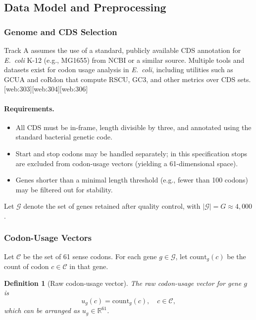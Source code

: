 \documentclass[11pt]{article}
\newtheorem{definition}{Definition}[section]
\newcommand{\R}{\mathbb{R}}
\begin{document}
\subsection{Data Model and Preprocessing}

\subsubsection{Genome and CDS Selection}

Track A assumes the use of a standard, publicly available CDS annotation for \emph{E.~coli} K-12 (e.g., MG1655) from NCBI or a similar source.
Multiple tools and datasets exist for codon usage analysis in \emph{E.~coli}, including utilities such as GCUA and coRdon that compute RSCU, GC3, and other metrics over CDS sets.[web:303][web:304][web:306]

\paragraph{Requirements.}
\begin{itemize}[leftmargin=1.8em]
  \item All CDS must be in-frame, length divisible by three, and annotated using the standard bacterial genetic code.
  \item Start and stop codons may be handled separately; in this specification stops are excluded from codon-usage vectors (yielding a 61-dimensional space).
  \item Genes shorter than a minimal length threshold (e.g., fewer than 100 codons) may be filtered out for stability.
\end{itemize}

Let \(\mathcal{G}\) denote the set of genes retained after quality control, with \(|\mathcal{G}| = G \approx 4{,}000\).

\subsubsection{Codon-Usage Vectors}

Let \(\mathcal{C}\) be the set of 61 sense codons.
For each gene \(g \in \mathcal{G}\), let \(\mathrm{count}_g(c)\) be the count of codon \(c \in \mathcal{C}\) in that gene.

\begin{definition}[Raw codon-usage vector]
The raw codon-usage vector for gene \(g\) is
\[
  u_g(c) = \mathrm{count}_g(c), \quad c \in \mathcal{C},
\]
which can be arranged as \(u_g \in \R^{61}\).
\end{definition}
\end{document}
